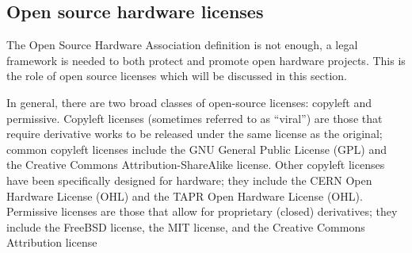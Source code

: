 \subsection{Open source hardware licenses} %

The Open Source Hardware Association definition is not enough, a legal framework is needed to both protect and promote open hardware projects. This is the role of open source licenses which will be discussed in this section.

In general, there are two broad classes of open-source licenses: copyleft and permissive. Copyleft licenses (sometimes referred to as “viral”) are those that require derivative works to be released under the same license as the original; common copyleft licenses include the GNU General Public License (GPL) and the Creative Commons Attribution-ShareAlike license. Other copyleft licenses have been specifically designed for hardware; they include the CERN Open Hardware License (OHL) and the TAPR Open Hardware License (OHL). Permissive licenses are those that allow for proprietary (closed) derivatives; they include the FreeBSD license, the MIT license, and the Creative Commons Attribution license


